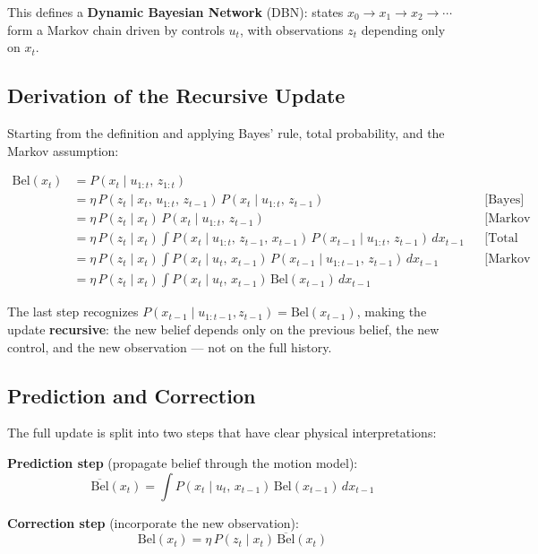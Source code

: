 \documentclass[11pt,a4paper]{article}
\theoremstyle{definition}
\theoremstyle{plain}
\theoremstyle{remark}
\begin{document}
This defines a \textbf{Dynamic Bayesian Network} (DBN): states $x_0 \to x_1 \to x_2 \to \cdots$ form a Markov chain driven by controls $u_t$, with observations $z_t$ depending only on $x_t$.

\subsection{Derivation of the Recursive Update}

Starting from the definition and applying Bayes' rule, total probability, and the Markov assumption:

\begin{align*}
\mathrm{Bel}(x_t)
&= P(x_t \mid u_{1:t},\, z_{1:t}) \\
&= \eta\, P(z_t \mid x_t,\, u_{1:t},\, z_{t-1})\, P(x_t \mid u_{1:t},\, z_{t-1}) && \text{[Bayes]}\\
&= \eta\, P(z_t \mid x_t)\, P(x_t \mid u_{1:t},\, z_{t-1}) && \text{[Markov (1)]}\\
&= \eta\, P(z_t \mid x_t)\! \int P(x_t \mid u_{1:t},\, z_{t-1},\, x_{t-1})\, P(x_{t-1} \mid u_{1:t},\, z_{t-1})\,dx_{t-1} && \text{[Total prob.]}\\
&= \eta\, P(z_t \mid x_t)\! \int P(x_t \mid u_t,\, x_{t-1})\, P(x_{t-1} \mid u_{1:t-1},\, z_{t-1})\,dx_{t-1} && \text{[Markov (2)]}\\
&= \eta\, P(z_t \mid x_t)\! \int P(x_t \mid u_t,\, x_{t-1})\, \mathrm{Bel}(x_{t-1})\,dx_{t-1}
\end{align*}

The last step recognizes $P(x_{t-1} \mid u_{1:t-1}, z_{t-1}) = \mathrm{Bel}(x_{t-1})$, making the update \textbf{recursive}: the new belief depends only on the previous belief, the new control, and the new observation — not on the full history.

\subsection{Prediction and Correction}

The full update is split into two steps that have clear physical interpretations:

\begin{tcolorbox}[colback=blue!5!white,colframe=blue!75!black,title=\textbf{Bayes Filter: Predict-Correct}]
\textbf{Prediction step} (propagate belief through the motion model):
\[
\overline{\mathrm{Bel}}(x_t) = \int P(x_t \mid u_t,\, x_{t-1})\,\mathrm{Bel}(x_{t-1})\,dx_{t-1}
\]

\textbf{Correction step} (incorporate the new observation):
\[
\mathrm{Bel}(x_t) = \eta\, P(z_t \mid x_t)\,\overline{\mathrm{Bel}}(x_t)
\]
\end{tcolorbox}
\end{document}

